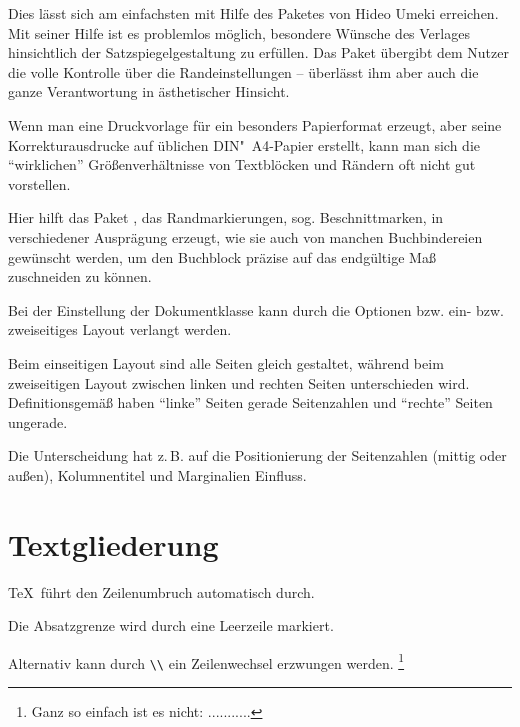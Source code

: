 
Dies lässt sich am einfachsten mit Hilfe des Paketes  von Hideo Umeki erreichen.
Mit seiner Hilfe ist es problemlos möglich, besondere Wünsche des Verlages hinsichtlich der Satzspiegelgestaltung zu erfüllen. Das Paket übergibt dem Nutzer die volle Kontrolle über die
Randeinstellungen -- überlässt ihm aber auch die ganze Verantwortung in ästhetischer Hinsicht.


Wenn man eine Druckvorlage für ein besonders Papierformat erzeugt, aber seine Korrekturausdrucke
auf üblichen DIN"~A4-Papier erstellt, kann man sich die \enquote{wirklichen} Größenverhältnisse von
Textblöcken und Rändern oft nicht gut vorstellen.

Hier hilft das Paket , das Randmarkierungen, sog. Beschnittmarken, in verschiedener
Ausprägung erzeugt, wie sie auch von manchen Buchbindereien gewünscht werden, um den Buchblock
präzise auf das endgültige Maß zuschneiden zu können.



Bei der Einstellung der Dokumentklasse kann durch die Optionen  bzw.
 ein- bzw. zweiseitiges Layout verlangt werden.

Beim einseitigen Layout sind alle Seiten gleich gestaltet, während beim zweiseitigen Layout zwischen
linken und rechten Seiten unterschieden wird. Definitionsgemäß haben \enquote{linke} Seiten gerade
Seitenzahlen und \enquote{rechte} Seiten ungerade.

Die Unterscheidung hat z.\,B. auf die Positionierung der Seitenzahlen (mittig oder außen), 
Kolumnentitel und Marginalien Einfluss.


\section{Textgliederung}


\TeX\ führt den Zeilenumbruch automatisch durch.

Die Absatzgrenze wird durch eine Leerzeile markiert. 

Alternativ kann durch \lstinline/\\/ ein Zeilenwechsel erzwungen werden.%
\footnote{Ganz so einfach ist es nicht: ...........}


